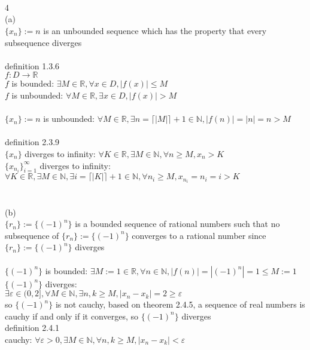 \documentclass[12pt, border = 4pt, multi]{article} %
\begin{document}
\\
\\
\\
4\\
(a)\\
$\{x_n\} := n$ is an unbounded sequence which has the property that every subsequence diverges\\
\\
definition 1.3.6\\
$f: D \rightarrow \mathbb{R}$\\
$f$ is bounded: $\exists M \in \mathbb{R}, \forall x \in D, |f(x)| \leq M$\\
$f$ is unbounded: $\forall M \in \mathbb{R}, \exists x \in D, |f(x)| > M$\\
\\
$\{x_n\} := n$ is unbounded: $\forall M \in \mathbb{R}, \exists n = \lceil|M|\rceil + 1 \in \mathbb{N}, |f(n)| = |n| = n > M$\\
\\
definition 2.3.9\\
$\{x_n\}$ diverges to infinity: $\forall K \in \mathbb{R}, \exists M \in \mathbb{N}, \forall n \geq M, x_n > K$\\
$\{x_{n_i}\}_{i = 1} ^ {\infty}$ diverges to infinity: $\forall K \in \mathbb{R}, \exists M \in \mathbb{N}, \exists i = \lceil|K|\rceil + 1 \in \mathbb{N}, \forall n_i \geq M, x_{n_i} = n_i = i > K$\\
\\
\\
(b)\\
$\{r_n\} := \{(-1) ^ n\}$ is a bounded sequence of rational numbers such that no subsequence of $\{r_n\} := \{(-1) ^ n\}$ converges to a rational number since $\{r_n\} := \{(-1) ^ n\}$ diverges\\
\\
$\{(-1) ^ n\}$ is bounded: $\exists M := 1 \in \mathbb{R}, \forall n \in \mathbb{N}, |f(n)| = |(-1) ^ n| = 1 \leq M := 1$\\
$\{(-1) ^ n\}$ diverges:\\
$\exists \varepsilon \in (0, 2], \forall M \in \mathbb{N}, \exists n, k \geq M, |x_n - x_k| = 2 \geq \varepsilon$\\
so $\{(-1) ^ n\}$ is not cauchy, based on theorem 2.4.5, a sequence of real numbers is cauchy if and only if it converges, so $\{(-1) ^ n\}$ diverges\\
definition 2.4.1\\
cauchy: $\forall \varepsilon > 0, \exists M \in \mathbb{N}, \forall n, k \geq M, |x_n - x_k| < \varepsilon$\\
\end{document}
